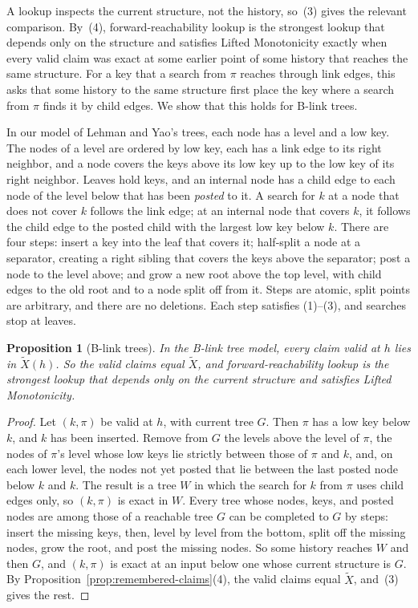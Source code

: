 \documentclass[sigconf]{cidr-2027}
\newtheorem{proposition}{Proposition}
\theoremstyle{remark}
\begin{document}
A lookup inspects the current structure, not the history, so~(3) gives the
relevant comparison. By~(4), forward-reachability lookup is the strongest
lookup that depends only on the structure and satisfies Lifted Monotonicity
exactly when every valid claim was exact at some earlier point of some history
that reaches the same structure. For a key that a search from $\pi$ reaches
through link edges, this asks that some history to the same structure first
place the key where a search from $\pi$ finds it by child edges. We show that
this holds for B-link trees.

In our model of Lehman and Yao's trees, each node has a level and a low key. The nodes of a level are ordered by low key, each has a link edge to its right
neighbor, and a node covers the keys above its low key up to the low key of
its right neighbor. Leaves hold keys, and an internal node has a child edge to
each node of the level below that has been \emph{posted} to it. A search for
$k$ at a node that does not cover $k$ follows the link edge; at an internal
node that covers $k$, it follows the child edge to the posted child with the
largest low key below $k$. There are four steps: insert a key into the leaf
that covers it; half-split a node at a separator, creating a right sibling
that covers the keys above the separator; post a node to the level above; and
grow a new root above the top level, with child edges to the old root and to a
node split off from it. Steps are atomic, split points are arbitrary, and
there are no deletions. Each step satisfies (1)--(3), and searches stop at
leaves.

\begin{proposition}[B-link trees]
\label{prop:blink}
In the B-link tree model, every claim valid at $h$ lies in
$\widetilde X(h)$. So the valid claims equal $\widetilde X$, and
forward-reachability lookup is the strongest lookup that depends only on the
current structure and satisfies Lifted Monotonicity.
\end{proposition}

\begin{proof}
Let $(k,\pi)$ be valid at $h$, with current tree $G$. Then $\pi$ has a low
key below $k$, and $k$ has been inserted. Remove from $G$ the levels above
the level of $\pi$, the nodes of $\pi$'s level whose low keys lie strictly
between those of $\pi$ and $k$, and, on each lower level, the nodes not yet
posted that lie between the last posted node below $k$ and $k$. The result is
a tree $W$ in which the search for $k$ from $\pi$ uses child edges only, so
$(k,\pi)$ is exact in $W$. Every tree whose nodes, keys, and posted nodes are
among those of a reachable tree $G$ can be completed to $G$ by steps: insert
the missing keys, then, level by level from the bottom, split off the missing
nodes, grow the root, and post the missing nodes. So some history reaches $W$
and then $G$, and $(k,\pi)$ is exact at an input below one whose current
structure is $G$. By Proposition~\ref{prop:remembered-claims}(4), the valid
claims equal $\widetilde X$, and~(3) gives the rest.
\end{proof}
\end{document}
